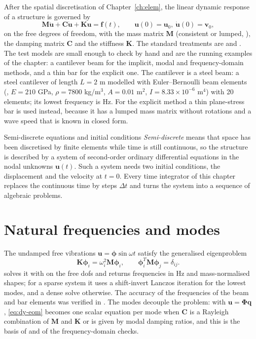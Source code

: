 After the spatial discretisation of Chapter~\ref{ch:elem}, the linear dynamic response of a structure is governed by
\begin{equation}\label{eq:dy-eom}
\bm M\ddot{\bm u}+\bm C\dot{\bm u}+\bm K\bm u=\bm f(t),\qquad \bm u(0)=\bm u_0,\ \dot{\bm u}(0)=\bm v_0,
\end{equation}
on the free degrees of freedom, with the mass matrix $\bm M$ (consistent or lumped, ), the damping matrix $\bm C$ and the stiffness $\bm K$. The standard treatments are \citet{bathe2014fep} and \citet{zienkiewicz2013fem}. The test models are small enough to check by hand and are the running examples of the chapter: a cantilever beam for the implicit, modal and frequency-domain methods, and a thin bar for the explicit one. The cantilever is a steel beam: a steel cantilever of length $L=2$ m modelled with Euler--Bernoulli beam elements (, $E=210$ GPa, $\rho=7800$ kg/m$^3$, $A=0.01$ m$^2$, $I=8.33\times10^{-6}$ m$^4$) with 20 elements; its lowest frequency is \cdyFirstFreq{} Hz. For the explicit method a thin plane-stress bar is used instead, because it has a lumped mass matrix without rotations and a wave speed that is known in closed form.

\begin{sidenote}{Semi-discrete equations and initial conditions}
\emph{Semi-discrete} means that space has been discretised by finite elements while time is still continuous, so the structure is described by a system of second-order ordinary differential equations in the nodal unknowns $\bm u(t)$. Such a system needs two initial conditions, the displacement and the velocity at $t=0$. Every time integrator of this chapter replaces the continuous time by steps $\Delta t$ and turns the system into a sequence of algebraic problems.
\end{sidenote}

\section{Natural frequencies and modes}\label{sec:dy-modal}

The undamped free vibrations $\bm u=\bm\phi\sin\omega t$ satisfy the generalised eigenproblem
\begin{equation}\label{eq:dy-eig}
\bm K\bm\phi_i=\omega_i^{2}\bm M\bm\phi_i,\qquad \bm\phi_i^{T}\bm M\bm\phi_j=\delta_{ij}.
\end{equation}
 solves it with  on the free dofs and returns frequencies in Hz and mass-normalised shapes; for a sparse system it uses a shift-invert Lanczos iteration for the lowest modes, and a dense solve otherwise. The accuracy of the frequencies of the beam and bar elements was verified in . The modes decouple the problem: with $\bm u=\bm\Phi\bm q$, \eqref{eq:dy-eom} becomes one scalar equation per mode when $\bm C$ is a Rayleigh combination of $\bm M$ and $\bm K$ or is given by modal damping ratios, and this is the basis of  and of the frequency-domain checks.

